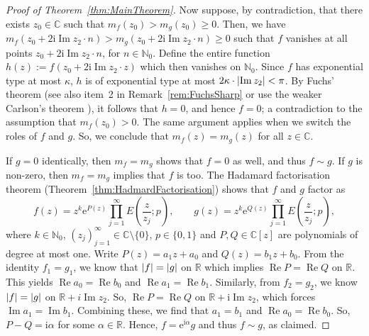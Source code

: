 \documentclass{article}
\newcommand{\bbC}{\mathbb{C}}
\newcommand{\bbN}{\mathbb{N}}
\newcommand{\bbR}{\mathbb{R}}
\newcommand{\rme}{\mathrm{e}}
\newcommand{\rmi}{\mathrm{i}}
\DeclarePairedDelimiter{\abs}{\lvert}{\rvert}
\renewcommand{\Re}{\operatorname{Re}}
\renewcommand{\Im}{\operatorname{Im}}
\theoremstyle{remark}
\begin{document}
\begin{proof}[Proof of Theorem~\ref{thm:MainTheorem}]
        Now suppose, by contradiction, that there exists $z_0 \in \bbC$ such that $m_f(z_0) > m_g(z_0) \geq 0$. Then, we have $m_f(z_0 + 2 \rmi \Im z_2 \cdot n) > m_g(z_0 + 2 \rmi \Im z_2 \cdot n) \geq 0$ such that $f$ vanishes at all points $z_0 + 2\rmi \Im z_2 \cdot n$, for $n \in \bbN_0$. Define the entire function $h(z) := f(z_0 + 2 \rmi \Im z_2 \cdot z)$ which then vanishes on $\bbN_0$. Since $f$ has exponential type at most $\kappa$, $h$ is of exponential type at most $2 \kappa \cdot \abs{\Im z_2} < \pi$. By Fuchs' theorem (see also item~2 in Remark~\ref{rem:FuchsSharp} or use the weaker Carlson's theorem \cite[see, e.g., Section~5.8.1 on p.~186]{Titchmarsh1939Theory}), it follows that $h = 0$, and hence $f = 0$; a contradiction to the assumption that $m_f(z_0) > 0$. The same argument applies when we switch the roles of $f$ and $g$. So, we conclude that $m_f(z) = m_g(z)$ for all $z \in \bbC$.

        If $g = 0$ identically, then $m_f = m_g$ shows that $f = 0$ as well, and thus $f \sim g$. If $g$ is non-zero, then $m_f = m_g$ implies that $f$ is too. The Hadamard factorisation theorem (Theorem~\ref{thm:HadmardFactorisation}) shows that $f$ and $g$ factor as
        \begin{equation*}
            f(z) = z^k \rme^{P(z)} \prod_{j = 1}^\infty E\left( \frac{z}{z_j}; p \right), \qquad g(z) = z^k \rme^{Q(z)} \prod_{j = 1}^\infty E\left( \frac{z}{z_j}; p \right),
        \end{equation*}
        where $k \in \mathbb{N}_0$, $(z_j)_{j = 1}^\infty \in \mathbb{C} \setminus \{0\}$, $p \in \{0, 1\}$ and $P, Q \in \bbC[z]$ are polynomials of degree at most one. Write $P(z) = a_1 z + a_0$ and $Q(z) = b_1 z + b_0$. From the identity $f_1 = g_1$, we know that $\abs{f} = \abs{g}$ on $\bbR$ which implies $\Re P = \Re Q$ on $\bbR$. This yields $\Re a_0 = \Re b_0$ and $\Re a_1 = \Re b_1$. Similarly, from $f_2 = g_2$, we know $\abs{f} = \abs{g}$ on $\bbR + i \Im z_2$. So, $\Re P = \Re Q$ on $\bbR + \rmi \Im z_2$, which forces $\Im a_1 = \Im b_1$. Combining these, we find that $a_1 = b_1$ and $\Re a_0 = \Re b_0$. So, $P - Q = \rmi \alpha$ for some $\alpha \in \bbR$. Hence, $f = \rme^{\rmi \alpha} g$ and thus $f \sim g$, as claimed.
    \end{proof}
\end{document}
